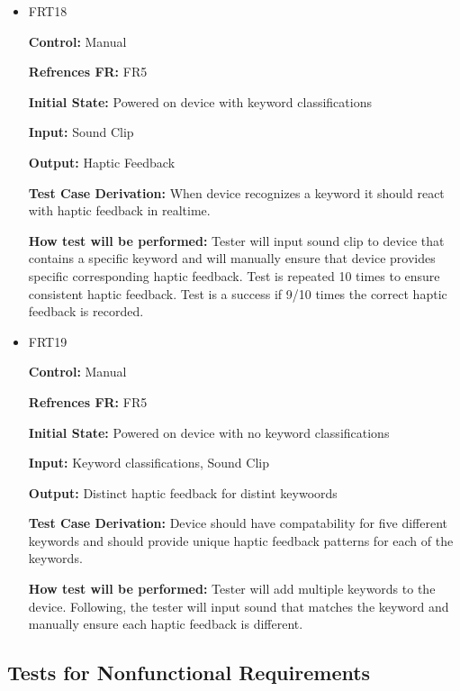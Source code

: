 \documentclass[12pt, titlepage]{article}
\begin{document}
\begin{itemize}
\item{FRT18}

\textbf{Control:} Manual 

\textbf{Refrences FR:} FR5 					

\textbf{Initial State:} Powered on device with keyword classifications
					
\textbf{Input:} Sound Clip
					
\textbf{Output:} Haptic Feedback

\textbf{Test Case Derivation:} When device recognizes a keyword it should react with haptic feedback in realtime.
					
\textbf{How test will be performed:} Tester will input sound clip to device that contains a specific keyword and will manually ensure that device provides specific corresponding haptic feedback. Test is repeated 10 times to ensure consistent haptic feedback. Test is a success if 9/10 times the correct haptic feedback is recorded.


\item{FRT19}

\textbf{Control:} Manual

\textbf{Refrences FR:} FR5 					

\textbf{Initial State:} Powered on device with no keyword classifications
					
\textbf{Input:} Keyword classifications, Sound Clip
					
\textbf{Output:} Distinct haptic feedback for distint keywoords

\textbf{Test Case Derivation:} Device should have compatability for five different keywords and should provide unique haptic feedback patterns for each of the keywords.
					
\textbf{How test will be performed:} Tester will add multiple keywords to the device. Following, the tester will input sound that matches the keyword and manually ensure each haptic feedback is different.


\end{itemize}

\subsection{Tests for Nonfunctional Requirements}
\end{document}
